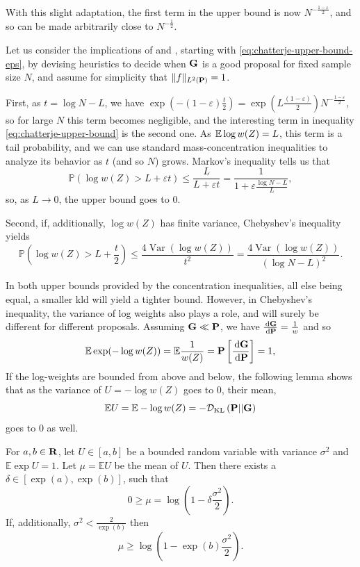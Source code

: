 With this slight adaptation, the first term in the upper bound is now $N^{-\frac{1-\varepsilon}{2}}$, and so can be made arbitrarily close to $N^{-\frac{1}{2}}$. 

Let us consider the implications of  and , starting with \eqref{eq:chatterje-upper-bound-eps}, by devising heuristics to decide when $\G$ is a good proposal for fixed sample size $N$, and assume for simplicity that $ \lVert f \rVert_{L^{2}(\P)} = 1 $.

First, as $t = \log N - L$, we have $\exp(- (1-\varepsilon) \frac{t}{2}) =  \exp (L \frac{(1-\varepsilon)}{2})N^{-\tfrac{1 - \varepsilon}{2}}$, so for large $N$ this term becomes negligible, and the interesting term in inequality \eqref{eq:chatterje-upper-bound} is the second one. As $\E \log w(Z) = L$, this term is a tail probability, and we can use standard mass-concentration inequalities to analyze its behavior as $t$ (and so $N$) grows. Markov's inequality tells us that 
$$
\mathbb P \left( \log w(Z) > L + \varepsilon t \right) \leq \frac{L}{L + \varepsilon t} = \frac{1}{1 + \varepsilon\frac{\log N - L}{L}},
$$
so, as $L \to 0$, the upper bound goes to $0$. 

Second, if, additionally, $\log w(Z)$ has finite variance, Chebyshev's inequality yields 
$$
\mathbb P \left( \log w (Z) > L + \frac{t}{2} \right) \leq \frac{4\operatorname{Var} (\log w(Z))}{t^{2}} = \frac{4\operatorname{Var} (\log w(Z))}{\left( \log N - L \right)^2}.
$$

In both upper bounds provided by the concentration inequalities, all else being equal, a smaller \gls{kld} will yield a tighter bound. However, in Chebyshev's inequality, the variance of log weights also plays a role, and will surely be different for different proposals.
Assuming $\G \ll \P$, we have $ \frac{\d \G}{\d\P} = \frac{1}{w}$ and so 
$$\mathbb E \exp (- \log w(Z) ) = \mathbb E \frac{1}{w(Z)} = \P \left[\frac{\d \G}{\d\P}\right] = 1,$$
If the log-weights are bounded from above and below, the following lemma shows that as the variance of $U = -\log w(Z)$ goes to $0$, their mean,
$$
\mathbb E U = \mathbb E - \log w(Z) = -\Dkl{\P}{\G}
$$
goes to $0$ as well.
\begin{lemma}
    \label{lem:bounded-log-variance}
    For $a,b \in \R$, let $U \in [a,b]$ be a bounded random variable with variance $\sigma^{2}$ and $\mathbb E \exp U = 1$. Let $\mu = \mathbb E U$ be the mean of $U$. Then there exists a $\delta \in [\exp(a),\exp(b)]$, such that 
    $$
    0 \geq \mu = \log \left( 1 - \delta \frac{\sigma^{2}}{2} \right).
    $$
    If, additionally, $\sigma^{2} < \frac{2}{\exp(b)}$ then 
    $$
    \mu \geq \log \left( 1 - \exp(b) \frac{\sigma^{2}}{2} \right).
    $$
\end{lemma}

